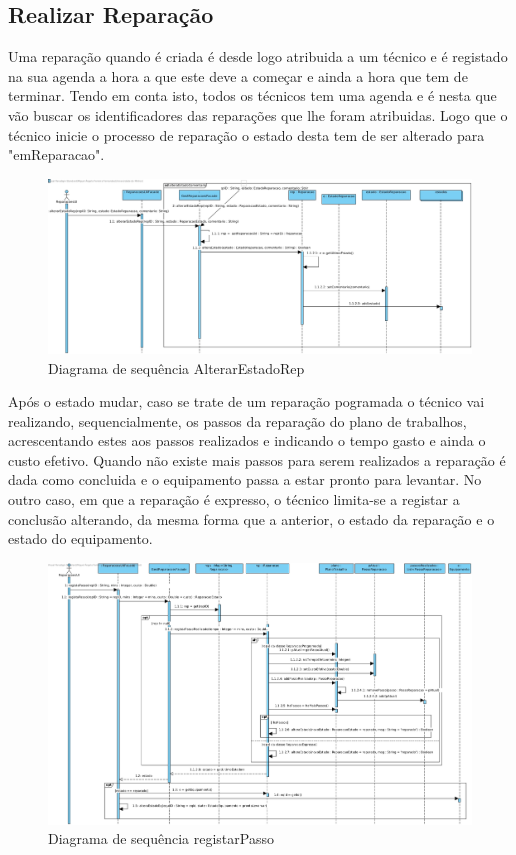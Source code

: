\documentclass[../relatorio.tex]{subfiles}
\begin{document}
\subsection{Realizar Reparação}

Uma reparação quando é criada é desde logo atribuida a um técnico e é registado na sua agenda a hora a que este deve a começar e ainda
a hora que tem de terminar. Tendo em conta isto, todos os técnicos tem uma agenda e é nesta que vão buscar os identificadores das reparações
que lhe foram atribuidas.
Logo que o técnico inicie o processo de reparação o estado desta tem de ser alterado para "emReparacao".

\begin{figure}[!ht]
    \centering
    \includegraphics[scale=0.45]{../assets/diagramas_sequencia/sd-AlterarEstadoRep.jpg}
    \caption{Diagrama de sequência AlterarEstadoRep}
\end{figure}

Após o estado mudar, caso se trate de um reparação pogramada o técnico vai realizando, sequencialmente, os passos da reparação do plano de trabalhos,
acrescentando estes aos passos realizados e indicando o tempo gasto e ainda o custo efetivo. Quando não existe mais passos para serem realizados a 
reparação é dada como concluida e o equipamento passa a estar pronto para levantar. No outro caso, em que a reparação é expresso, o técnico limita-se a
registar a conclusão alterando, da mesma forma que a anterior, o estado da reparação e o estado do equipamento.

\begin{figure}[!ht]
    \centering
    \includegraphics[scale=0.45]{../assets/diagramas_sequencia/sd-RegistaPasso.jpg}
    \caption{Diagrama de sequência registarPasso}
\end{figure}
\end{document}
